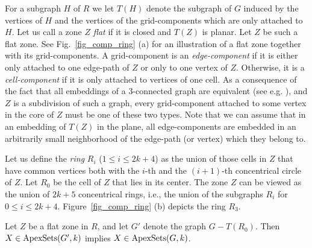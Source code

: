 \documentclass{llncs}
\begin{document}
For a subgraph $H$ of $R$ we let  $T(H)$ denote the subgraph of $G$ induced by the vertices of $H$ and
the vertices of the grid-components which are only attached to $H$.
Let us call a zone $Z$ \emph{flat} if it is closed and $T(Z)$ is planar.
Let $Z$ be such a flat zone.
See Fig.~\ref{fig_comp_ring} (a) for an illustration of a flat zone together with its grid-components.
A grid-component is an \emph{edge-component} if it is
either only attached to one edge-path  of $Z$ or only to one vertex of $Z$.
Otherwise, it is a \emph{cell-component} if it is only attached to vertices of one cell.
As a consequence of the fact that all embeddings of a 3-connected graph are equivalent
(see e.g. \cite{die00}), and $Z$ is a subdivision of such a graph,
every grid-component attached to some vertex in the core of $Z$ must be one of these two types.
Note that we can assume that in an embedding of $T(Z)$ in the plane,
all edge-components are embedded in an arbitrarily small neighborhood of
the edge-path (or vertex) which they belong to.

Let us define the \emph{ring} $R_i$ ($1 \leq i \leq 2k+4$) as the union of those cells in $Z$
that have common vertices both with the $i$-th and the $(i+1)$-th concentrical circle of $Z$.
Let $R_0$ be the cell of $Z$ that lies in its center.
The zone $Z$ can be viewed as the union of $2k+5$ concentrical rings,
i.e., the union of the subgraphs $R_i$ for $0 \leq i \leq 2k+4$.
Figure~\ref{fig_comp_ring} (b) depicts the ring $R_3$.

\begin{lemma}
\label{equivalence}
Let $Z$ be a flat zone in $R$, and let $G'$ denote the graph $G-T(R_0)$.
Then $X \in \textup{ApexSets}(G',k)$ implies $X \in \textup{ApexSets}(G,k)$.
\end{lemma}
\end{document}
